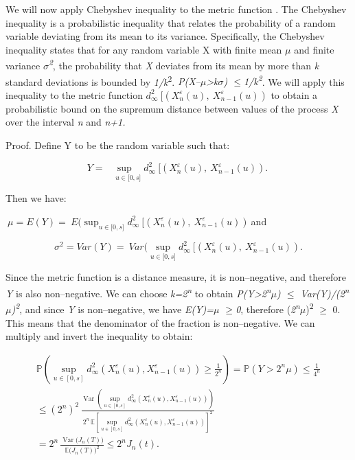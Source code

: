 \documentclass[12pt,a4paper]{report}
\numberwithin{equation}{section}
\begin{document}
We will now apply Chebyshev inequality to the metric function \cite{llendeto2007modeling_82}.
The Chebyshev inequality is a probabilistic inequality that relates the
probability of a random variable deviating from its mean to its
variance. Specifically, the Chebyshev inequality states that for any
random variable X with finite mean \emph{$\mu$} and finite variance
\emph{$\sigma$\textsuperscript{2}}, the probability that \emph{X} deviates from
its mean by more than \emph{k} standard deviations is bounded by
\emph{1/k}\textsuperscript{2}.
\emph{P(\textbar X--$\mu$\textbar\textgreater k$\sigma$) $\leq$1/k\textsuperscript{2}}.
We will apply this inequality to the metric function
\(d_{\infty}^{2}\ \lbrack\left( X_{n}^{\varepsilon}(u),\ X_{n - 1}^{\varepsilon}(u) \right)\)
to obtain a probabilistic bound on the supremum distance between values
of the process \emph{X} over the interval \emph{n} and \emph{n+1.}

Proof. Define Y to be the random variable such that:

\[{Y = \sup_{\ \ \ \ \ u \in \lbrack 0,s\rbrack}}{d_{\infty}^{2}\ \lbrack\left( X_{n}^{\varepsilon}(u),\ X_{n - 1}^{\varepsilon}(u) \right).\ }\]

Then we have:

\({\ \mu = E(Y) = \ E(\sup_{u \in \lbrack 0,s\rbrack}}{d_{\infty}^{2}\ \lbrack\left( X_{n}^{\varepsilon}(u),\ X_{n - 1}^{\varepsilon}(u) \right)\ }\)and

\[{\ \sigma^{2} = Var(Y) = \ Var(\sup_{u \in \lbrack 0,s\rbrack}}{d_{\infty}^{2}\ \lbrack\left( X_{n}^{\varepsilon}(u),\ X_{n - 1}^{\varepsilon}(u) \right).\ }\]

Since the metric function is a distance measure, it is non--negative, and
therefore \emph{Y} is also non--negative. We can choose
\emph{k=2\textsuperscript{n}} to obtain
\emph{P(Y\textgreater2\textsuperscript{n}$\mu$) $\leq$
Var(Y)/(2\textsuperscript{n}$\mu$)\textsuperscript{2}}, and since \emph{Y}
is non--negative, we have \emph{E(Y)=$\mu$ $\geq$0}, therefore
(\emph{2\textsuperscript{n}$\mu$})\textsuperscript{2} $\geq$ 0. This means that
the denominator of the fraction is non--negative. We can multiply and
invert the inequality to obtain:

\begin{equation}\tag{5.1.18}\label{eq:5.1.18}
\begin{gathered}
\mathbb{P}\!\left(\sup_{u\in[0,s]}
d_{\infty}^{2}\!\left(X_{n}^{\varepsilon}(u),X_{n-1}^{\varepsilon}(u)\right)
\ge \frac{1}{2^{n}}\right)
= \mathbb{P}\!\left(Y>2^{n}\mu\right)
\le \frac{1}{4^{n}} \\
\le (2^{n})^{2}\,
\frac{\operatorname{Var}\!\left(\sup_{u\in[0,s]}
d_{\infty}^{2}\!\left(X_{n}^{\varepsilon}(u),X_{n-1}^{\varepsilon}(u)\right)\right)}
{2^{n}\,\mathbb{E}\!\left[\sup_{u\in[0,s]}
d_{\infty}^{2}\!\left(X_{n}^{\varepsilon}(u),X_{n-1}^{\varepsilon}(u)\right)\right]^{2}} \\
= 2^{n}\,\frac{\operatorname{Var}\!\bigl(J_{n}(T)\bigr)}
{\mathbb{E}\!\bigl(J_{n}(T)\bigr)^{2}}
\le 2^{n}J_{n}(t).
\end{gathered}
\end{equation}
\end{document}
